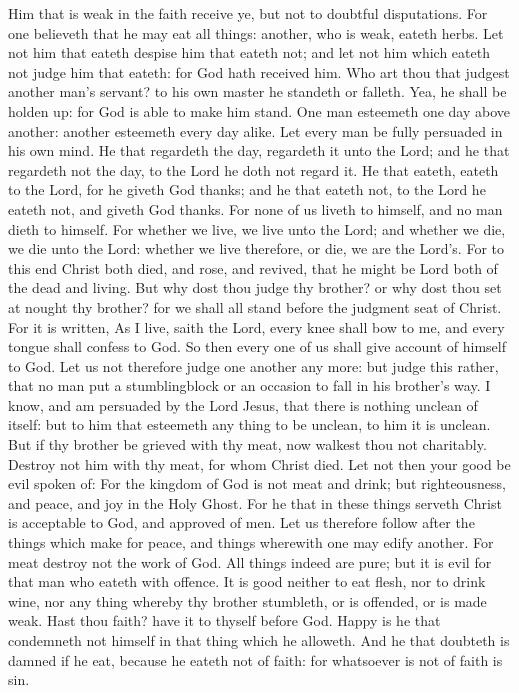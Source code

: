  Him that is weak in the faith receive ye, but not to
doubtful disputations.  For one believeth that he may eat
all things: another, who is weak, eateth herbs.  Let not
him that eateth despise him that eateth not; and let not him which
eateth not judge him that eateth: for God hath received him.
 Who art thou that judgest another man's servant? to his
own master he standeth or falleth. Yea, he shall be holden up: for God
is able to make him stand.  One man esteemeth one day
above another: another esteemeth every day alike. Let every man be fully
persuaded in his own mind.  He that regardeth the day,
regardeth it unto the Lord; and he that regardeth not the day, to the
Lord he doth not regard it. He that eateth, eateth to the Lord, for he
giveth God thanks; and he that eateth not, to the Lord he eateth not,
and giveth God thanks.  For none of us liveth to himself,
and no man dieth to himself.  For whether we live, we live
unto the Lord; and whether we die, we die unto the Lord: whether we live
therefore, or die, we are the Lord's.  For to this end
Christ both died, and rose, and revived, that he might be Lord both of
the dead and living.  But why dost thou judge thy
brother? or why dost thou set at nought thy brother? for we shall all
stand before the judgment seat of Christ.  For it is
written, As I live, saith the Lord, every knee shall bow to me, and
every tongue shall confess to God.  So then every one of
us shall give account of himself to God.  Let us not
therefore judge one another any more: but judge this rather, that no man
put a stumblingblock or an occasion to fall in his brother's way.
 I know, and am persuaded by the Lord Jesus, that there
is nothing unclean of itself: but to him that esteemeth any thing to be
unclean, to him it is unclean.  But if thy brother be
grieved with thy meat, now walkest thou not charitably. Destroy not him
with thy meat, for whom Christ died.  Let not then your
good be evil spoken of:  For the kingdom of God is not
meat and drink; but righteousness, and peace, and joy in the Holy Ghost.
 For he that in these things serveth Christ is acceptable
to God, and approved of men.  Let us therefore follow
after the things which make for peace, and things wherewith one may
edify another.  For meat destroy not the work of God. All
things indeed are pure; but it is evil for that man who eateth with
offence.  It is good neither to eat flesh, nor to drink
wine, nor any thing whereby thy brother stumbleth, or is offended, or is
made weak.  Hast thou faith? have it to thyself before
God. Happy is he that condemneth not himself in that thing which he
alloweth.  And he that doubteth is damned if he eat,
because he eateth not of faith: for whatsoever is not of faith is sin.

